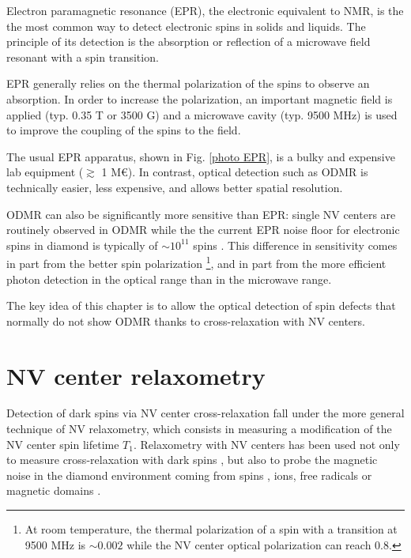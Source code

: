 \documentclass[a4paper, 11pt]{book}
\begin{document}
Electron paramagnetic resonance (EPR), the electronic equivalent to NMR, is the the most common way to detect electronic spins in solids and liquids. The principle of its detection is the absorption or reflection of a microwave field resonant with a spin transition.

EPR generally relies on the thermal polarization of the spins to observe an absorption. In order to increase the polarization, an important magnetic field is applied (typ. 0.35 T or 3500 G) and a microwave cavity (typ. 9500 MHz) is used to improve the coupling of the spins to the field.

The usual EPR apparatus, shown in Fig. \ref{photo EPR}, is a bulky and expensive lab equipment ($\gtrsim$ 1 M€). In contrast, optical detection such as ODMR is technically easier, less expensive, and allows better spatial resolution. 

ODMR can also be significantly more sensitive than EPR: single NV centers are routinely observed in ODMR while the the current EPR noise floor for electronic spins in diamond is typically of $\sim 10^{11}$ spins \citep{mitchell2013x}. This difference in sensitivity comes in part from the better spin polarization \footnote{At room temperature, the thermal polarization of a spin with a transition at 9500 MHz is $\sim 0.002$ while the NV center optical polarization can reach 0.8.}, and in part from the more efficient photon detection in the optical range than in the microwave range.

The key idea of this chapter is to allow the optical detection of spin defects that normally do not show ODMR thanks to cross-relaxation with NV centers.

\section{NV center relaxometry}

Detection of dark spins via NV center cross-relaxation fall under the more general technique of NV relaxometry, which consists in measuring a modification of the NV center spin lifetime $T_1$. Relaxometry with NV centers has been used not only to measure cross-relaxation with dark spins \citep{van1989cross, holliday1989optical, epstein2005anisotropic, armstrong2010nv,   hall2016detection, wickenbrock2016microwave,  wood2016wide,  alfasi2019detection, lazda2021cross}, but also to probe the magnetic noise in the diamond environment coming from spins \citep{steinert2013magnetic}, ions\citep{tetienne2013spin}, free radicals \citep{nie2021quantum}or magnetic domains \citep{finco2021imaging}. 
\end{document}
